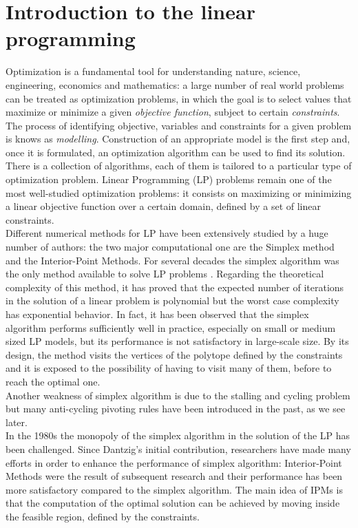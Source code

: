 \documentclass[a4paper,10 pt,titlepage,twoside]{book}
\theoremstyle{plain}
\theoremstyle{definition}
\theoremstyle{remark}
\begin{document}
\chapter{Introduction to the linear programming}
Optimization is a fundamental tool for understanding nature, science, engineering, economics and mathematics: a large number of real world problems can be treated as optimization problems, in which the goal is to select values that maximize or minimize a given \textit{objective function}, subject to certain \textit{constraints}.\\ The process of identifying objective, variables and constraints for a given problem is knows as \textit{modelling}. Construction of an appropriate model is the first step and, once it is formulated, an optimization algorithm can be used to find its solution.\\ There is a collection of algorithms, each of them is tailored to a particular type of optimization problem. Linear Programming (LP) problems remain one of the most well-studied optimization problems: it consists on maximizing or minimizing a linear objective function over a certain domain, defined by a set of linear constraints.\\
Different numerical methods for LP have been extensively studied by a huge number of authors: the two major computational one are the Simplex method and the Interior-Point Methods.
For several decades the simplex algorithm was the only method available to solve LP problems \cite{1}. Regarding the theoretical complexity of this method, it has proved that the expected number of iterations in the solution of a linear problem is polynomial but the worst case complexity has exponential behavior. In fact, it has been observed that the simplex algorithm performs sufficiently well in practice, especially on small or medium sized LP models, but its performance is not satisfactory in large-scale size. By its design, the method visits the vertices of the polytope defined by the constraints and it is exposed to the possibility of having to visit many of them, before to reach the optimal one.\\ Another weakness of simplex algorithm is due to the stalling and cycling problem but many anti-cycling pivoting rules have been introduced in the past, as we see later.\\
In the 1980s the monopoly of the simplex algorithm in the solution of the LP has been challenged. Since Dantzig's initial contribution, researchers have made many efforts in order to enhance the performance of simplex algorithm: Interior-Point Methods were the result of subsequent research and their performance has been more satisfactory compared to the simplex algorithm. The main idea of IPMs is that the computation of the optimal solution can be achieved by moving inside the feasible region, defined by the constraints.\\
\end{document}
